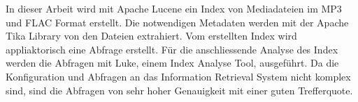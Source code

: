 In dieser Arbeit wird mit Apache Lucene ein
Index von Mediadateien im MP3 und FLAC Format erstellt.
Die notwendigen Metadaten werden mit der
Apache Tika Library von den Dateien extrahiert.
Vom erstellten Index wird appliaktorisch eine
Abfrage erstellt. Für die anschliessende Analyse
des Index werden die Abfragen mit Luke, einem
Index Analyse Tool, ausgeführt. Da die
Konfiguration und Abfragen an das Information
Retrieval System nicht komplex sind, sind
die Abfragen von sehr hoher Genauigkeit
mit einer guten Trefferquote.